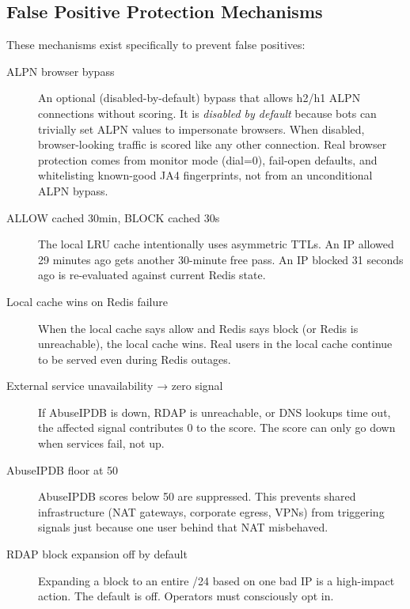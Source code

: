 \subsection{False Positive Protection Mechanisms}

These mechanisms exist specifically to prevent false positives:

\begin{description}
  \item[ALPN browser bypass] An optional (disabled-by-default) bypass that allows h2/h1
    ALPN connections without scoring. It is \emph{disabled by default} because bots can
    trivially set ALPN values to impersonate browsers. When disabled, browser-looking
    traffic is scored like any other connection. Real browser protection comes from
    monitor mode (dial=0), fail-open defaults, and whitelisting known-good JA4
    fingerprints, not from an unconditional ALPN bypass.

  \item[ALLOW cached 30min, BLOCK cached 30s] The local LRU cache intentionally uses
    asymmetric TTLs. An IP allowed 29 minutes ago gets another 30-minute free pass.
    An IP blocked 31 seconds ago is re-evaluated against current Redis state.

  \item[Local cache wins on Redis failure] When the local cache says allow and Redis
    says block (or Redis is unreachable), the local cache wins. Real users in the local
    cache continue to be served even during Redis outages.

  \item[External service unavailability → zero signal] If AbuseIPDB is down, RDAP is
    unreachable, or DNS lookups time out, the affected signal contributes 0 to the score.
    The score can only go down when services fail, not up.

  \item[AbuseIPDB floor at 50] AbuseIPDB scores below 50 are suppressed. This prevents
    shared infrastructure (NAT gateways, corporate egress, VPNs) from triggering signals
    just because one user behind that NAT misbehaved.

  \item[RDAP block expansion off by default] Expanding a block to an entire /24 based
    on one bad IP is a high-impact action. The default is off. Operators must consciously
    opt in.
\end{description}

